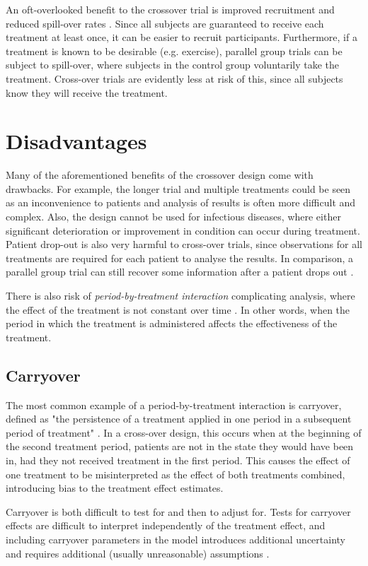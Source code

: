 \documentclass[12pt, TexShade, letterpaper]{report}
\begin{document}
An oft-overlooked benefit to the crossover trial is improved recruitment and reduced spill-over rates \cite{piantadosi2005clinical}. Since all subjects are guaranteed to receive each treatment at least once, it can be easier to recruit participants. Furthermore, if a treatment is known to be desirable (e.g. exercise), parallel group trials can be subject to spill-over, where subjects in the control group voluntarily take the treatment. Cross-over trials are evidently less at risk of this, since all subjects know they will receive the treatment.

\section{Disadvantages}
Many of the aforementioned benefits of the crossover design come with drawbacks. For example, the longer trial and multiple treatments could be seen as an inconvenience to patients and analysis of results is often more difficult and complex. Also, the design cannot be used for infectious diseases, where either significant deterioration or improvement in condition can occur during treatment. Patient drop-out is also very harmful to cross-over trials, since observations for all treatments are required for each patient to analyse the results. In comparison, a parallel group trial can still recover some information after a patient drops out \cite{senn2002crossover}.

There is also risk of \textit{period-by-treatment interaction} complicating analysis, where the effect of the treatment is not constant over time \cite{senn2002crossover}. In other words, when the period in which the treatment is administered affects the effectiveness of the treatment.

\subsection{Carryover}
The most common example of a period-by-treatment interaction is carryover, defined as "the persistence of a treatment applied in one period in a subsequent period of treatment" \cite{senn2002crossover}. In a cross-over design, this occurs when at the beginning of the second treatment period, patients are not in the state they would have been in, had they not received treatment in the first period. This causes the effect of one treatment to be misinterpreted as the effect of both treatments combined, introducing bias to the treatment effect estimates.

Carryover is both difficult to test for and then to adjust for. Tests for carryover effects are difficult to interpret independently of the treatment effect, and including carryover parameters in the model introduces additional uncertainty and requires additional (usually unreasonable) assumptions \cite{senn2002crossover}.
\end{document}
